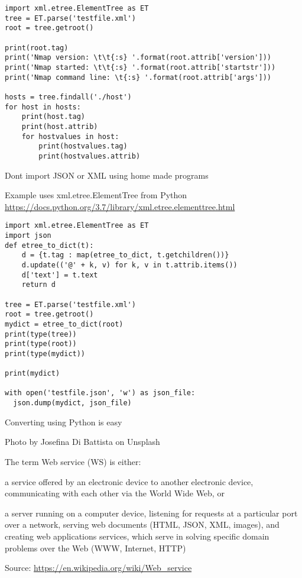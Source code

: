 \documentclass[Screen16to9,17pt]{foils}
\begin{document}

\begin{verbatim}
import xml.etree.ElementTree as ET
tree = ET.parse('testfile.xml')
root = tree.getroot()

print(root.tag)
print('Nmap version: \t\t{:s} '.format(root.attrib['version']))
print('Nmap started: \t\t{:s} '.format(root.attrib['startstr']))
print('Nmap command line: \t{:s} '.format(root.attrib['args']))

hosts = tree.findall('./host')
for host in hosts:
    print(host.tag)
    print(host.attrib)
    for hostvalues in host:
        print(hostvalues.tag)
        print(hostvalues.attrib)
\end{verbatim}

\begin{list2}
\item Dont import JSON or XML using home made programs
\item Example uses xml.etree.ElementTree from Python\\
\url{https://docs.python.org/3.7/library/xml.etree.elementtree.html}
\end{list2}


\begin{verbatim}
import xml.etree.ElementTree as ET
import json
def etree_to_dict(t):
    d = {t.tag : map(etree_to_dict, t.getchildren())}
    d.update(('@' + k, v) for k, v in t.attrib.items())
    d['text'] = t.text
    return d

tree = ET.parse('testfile.xml')
root = tree.getroot()
mydict = etree_to_dict(root)
print(type(tree))
print(type(root))
print(type(mydict))

print(mydict)

with open('testfile.json', 'w') as json_file:
  json.dump(mydict, json_file)
\end{verbatim}

Converting using Python is easy





Photo by Josefina Di Battista on Unsplash



  The term Web service (WS) is either:
  \begin{list2}
  \item  a service offered by an electronic device to another electronic device, communicating with each other via the World Wide Web, or
  \item a server running on a computer device, listening for requests at a particular port over a network, serving web documents (HTML, JSON, XML, images), and creating web applications services, which serve in solving specific domain problems over the Web (WWW, Internet, HTTP)
\end{list2}
Source: \url{https://en.wikipedia.org/wiki/Web_service}
\end{document}
